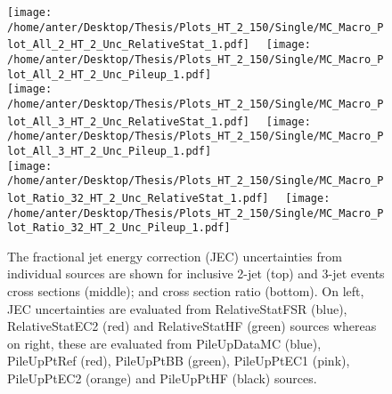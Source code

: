 \begin{figure}[!hbtp]
\hspace*{-5mm}\texttt{[image: /home/anter/Desktop/Thesis/Plots\_HT\_2\_150/Single/MC\_Macro\_Plot\_All\_2\_HT\_2\_Unc\_RelativeStat\_1.pdf]}%
~~\texttt{[image: /home/anter/Desktop/Thesis/Plots\_HT\_2\_150/Single/MC\_Macro\_Plot\_All\_2\_HT\_2\_Unc\_Pileup\_1.pdf]}\\
\hspace*{-5mm}\texttt{[image: /home/anter/Desktop/Thesis/Plots\_HT\_2\_150/Single/MC\_Macro\_Plot\_All\_3\_HT\_2\_Unc\_RelativeStat\_1.pdf]}%
~~\texttt{[image: /home/anter/Desktop/Thesis/Plots\_HT\_2\_150/Single/MC\_Macro\_Plot\_All\_3\_HT\_2\_Unc\_Pileup\_1.pdf]}\\
\hspace*{-5mm}\texttt{[image: /home/anter/Desktop/Thesis/Plots\_HT\_2\_150/Single/MC\_Macro\_Plot\_Ratio\_32\_HT\_2\_Unc\_RelativeStat\_1.pdf]}%
~~\texttt{[image: /home/anter/Desktop/Thesis/Plots\_HT\_2\_150/Single/MC\_Macro\_Plot\_Ratio\_32\_HT\_2\_Unc\_Pileup\_1.pdf]}
\caption{The fractional jet energy correction (JEC) uncertainties from individual sources are shown for inclusive 2-jet (top) and 3-jet events cross sections (middle); and cross section ratio \ratio (bottom). On left, JEC uncertainties are evaluated from RelativeStatFSR (blue), RelativeStatEC2 (red) and RelativeStatHF (green) sources whereas on right, these are evaluated from PileUpDataMC (blue), PileUpPtRef (red), PileUpPtBB (green), PileUpPtEC1 (pink), PileUpPtEC2 (orange) and PileUpPtHF (black) sources.}
\label{fig:jes3}
\end{figure}

